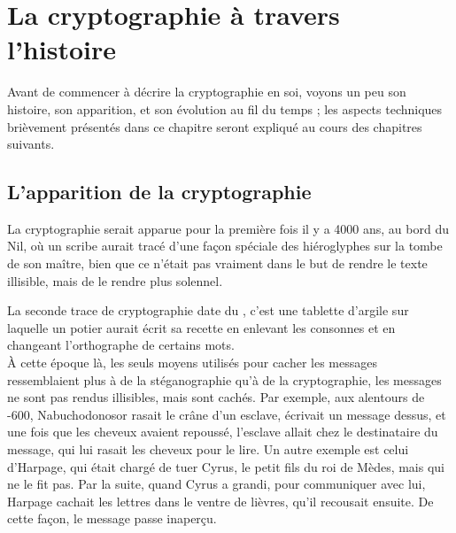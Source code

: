 \chapter{La cryptographie à travers l'histoire}
Avant de commencer à décrire la cryptographie en soi, voyons un peu
son histoire, son apparition, et son évolution au fil du temps ; les
aspects techniques brièvement présentés dans ce chapitre seront
expliqué au cours des chapitres suivants.

\section{L'apparition de la cryptographie}
La cryptographie serait apparue pour la première fois il y a 4000 ans,
au bord du Nil, où un scribe aurait tracé d'une façon spéciale des
hiéroglyphes sur la tombe de son maître, bien que ce n'était pas
vraiment dans le but de rendre le texte illisible, mais de le rendre
plus solennel.

La seconde trace de cryptographie date du , c'est une tablette
d'argile sur laquelle un potier aurait écrit sa recette en enlevant
les consonnes et en changeant l'orthographe de certains mots. \\

À cette époque là, les seuls moyens utilisés pour cacher les messages
ressemblaient plus à de la stéganographie qu'à de la cryptographie,
les messages ne sont pas rendus illisibles, mais sont cachés. Par
exemple, aux alentours de -600, Nabuchodonosor rasait le crâne d'un
esclave, écrivait un message dessus, et une fois que les cheveux
avaient repoussé, l'esclave allait chez le destinataire du message,
qui lui rasait les cheveux pour le lire. Un autre exemple est celui
d'Harpage, qui était chargé de tuer Cyrus, le petit fils du roi de
Mèdes, mais qui ne le fit pas. Par la suite, quand Cyrus a grandi,
pour communiquer avec lui, Harpage cachait les lettres dans le ventre
de lièvres, qu'il recousait ensuite. De cette façon, le message passe
inaperçu. \\

